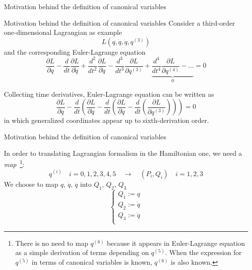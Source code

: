 \begin{frame}{Motivation behind the definition of canonical variables}
  \begin{alertblock}{Motivation behind the definition of canonical variables}
    \vspace{0.5em}
    Consider a third-order one-dimensional Lagrangian as example
    \begin{equation*}
      L\left( q, \dot{q}, \ddot{q}, q^{(3)} \right)
    \end{equation*}
    and the corresponding Euler-Lagrange equation
    \begin{equation*} \label{eq:third_order_euler_lagrangian}
      \frac{\partial L}{\partial q} -
      \frac{d}{dt}\frac{\partial L}{\partial \dot{q}} +
      \frac{d^2}{dt^2}\frac{\partial L}{\partial \ddot{q}} -
      \frac{d^3}{dt^3}\frac{\partial L}{\partial q^{(3)}} +
      \underbrace{
      \frac{d^4}{dt^4}\frac{\partial L}{\partial q^{(4)}} - \ldots }_0 = 0
    \end{equation*}

    Collecting time derivatives, Euler-Lagrange equation can be written as
    \begin{equation*} \label{eq:third_order_euler_lagrangian_with_parts}
      \frac{\partial L}{\partial q} -
      \frac{d}{dt} \left(
      \frac{\partial L}{\partial \dot{q}} -
      \frac{d}{dt} \left(
      \frac{\partial L}{\partial \ddot{q}} -
      \frac{d}{dt} \left(
      \frac{\partial L}{\partial q^{(3)}}
      \right)\right)\right) = 0
    \end{equation*}
    in which generalized coordinates appear up to sixth-derivation order.
  \end{alertblock}
\end{frame}

\begin{frame}{Motivation behind the definition of canonical variables}
  \begin{alertblock}{}
    In order to translating Lagrangian formalism in the Hamiltonian one, we
    need a \emph{map}~\footnote{
      There is no need to map $q^{(6)}$ because it appears in Euler-Lagrange
      equation as a simple derivation of terms depending on $q^{(5)}$. When
      the expression for $q^{(5)}$ in terms of canonical variables is known,
      $q^{(6)}$ is also known.
    }:
    \begin{equation*}
      q^{(i)} \quad i = 0, 1, 2, 3, 4, 5
      \quad \longrightarrow \quad
      (P_i , Q_i) \quad i = 1, 2, 3
    \end{equation*}
    We choose to map $q$, $\dot{q}$, $\ddot{q}$ into $Q_1$, $Q_2$, $Q_3$
    \begin{equation*}\label{eq:def_Q}
      \begin{cases}
        Q_1 := q \\
        Q_2 := \dot{q} \\
        Q_3 := \ddot{q} \\
      \end{cases}
    \end{equation*}
  \end{alertblock}
\end{frame}

